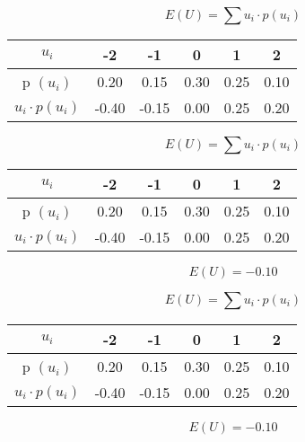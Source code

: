 \documentclass[]{report}
\begin{document}
	
	\[ E(U) =  \sum  u_i \cdot p(u_i)   \]
	\begin{center}
		\begin{tabular}{|c|c|c|c|c|c|}
			\hline $u_i$ & -2 & -1  & 0 & 1 & 2 \\ 
			\hline p $(u_i)$ & \phantom{s}0.20\phantom{s} & \phantom{s}0.15\phantom{s}  & \phantom{s}0.30\phantom{s}  & \phantom{s}0.25\phantom{s} & \phantom{s}0.10\phantom{s} \\ 
			\hline 
			$u_i \cdot p (u_i)$ & -0.40 & -0.15 & 0.00 & 0.25 & 0.20 \\\hline
		\end{tabular} 
		
		
	\end{center}
	
	\[ E(U) =  \sum  u_i \cdot p(u_i)   \]
	\begin{center}
		\begin{tabular}{|c|c|c|c|c|c|}
			\hline $u_i$ & -2 & -1  & 0 & 1 & 2 \\ 
			\hline p $(u_i)$ & \phantom{s}0.20\phantom{s} & \phantom{s}0.15\phantom{s}  & \phantom{s}0.30\phantom{s}  & \phantom{s}0.25\phantom{s} & \phantom{s}0.10\phantom{s} \\ 
			\hline 
			$u_i \cdot p (u_i)$ & -0.40 & -0.15 & 0.00 & 0.25 & 0.20 \\\hline
		\end{tabular} 
		
		
	\end{center}
	
	\[E(U) = -0.10\]
	
	\[ E(U) =  \sum  u_i \cdot p(u_i)   \]
	\begin{center}
		\begin{tabular}{|c|c|c|c|c|c|}
			\hline $u_i$ & -2 & -1  & 0 & 1 & 2 \\ 
			\hline p $(u_i)$ & \phantom{s}0.20\phantom{s} & \phantom{s}0.15\phantom{s}  & \phantom{s}0.30\phantom{s}  & \phantom{s}0.25\phantom{s} & \phantom{s}0.10\phantom{s} \\ 
			\hline 
			$u_i \cdot p (u_i)$ & -0.40 & -0.15 & 0.00 & 0.25 & 0.20 \\\hline
		\end{tabular} 
		
		
	\end{center}
	
	\[E(U) = -0.10\]
	
	
	
\end{document}
